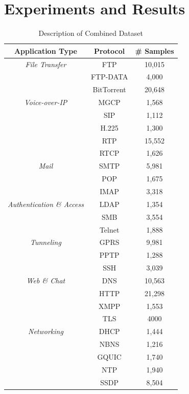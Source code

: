 \section{Experiments and Results}
\begin{table} [ht!]
\caption{Description of Combined Dataset}
\centering
\begin{tabular}{|c |c | c |}
\hline
\textbf{Application Type} & \textbf{Protocol} & \textbf{\# Samples} \\
\hline
\hline
\textit{File Transfer} & FTP & 10,015 \\
& FTP-DATA & 4,000 \\
& BitTorrent &  20,648 \\
\hline
\hline
\textit{Voice-over-IP} & MGCP & 1,568 \\
& SIP & 1,112 \\
& H.225 &  1,300 \\
& RTP &  15,552 \\
& RTCP &  1,626 \\
\hline
\hline
\textit{Mail} & SMTP & 5,981 \\
& POP & 1,675 \\
& IMAP &  3,318 \\
\hline
\hline
\textit{Authentication \& Access} & LDAP & 1,354 \\
& SMB &  3,554 \\
& Telnet & 1,888 \\
\hline
\hline
\textit{Tunneling} & GPRS & 9,981 \\
& PPTP & 1,288 \\
& SSH & 3,039 \\
\hline
\hline
\textit{Web \& Chat} & DNS & 10,563 \\
& HTTP & 21,298 \\
& XMPP &  1,553 \\
& TLS & 4000 \\
\hline
\hline
\textit{Networking} & DHCP & 1,444 \\
& NBNS & 1,216 \\
& GQUIC &  1,740 \\
& NTP & 1,940 \\
& SSDP &  8,504 \\
\hline
\end{tabular}
\label{table:dataset}
\end{table}

